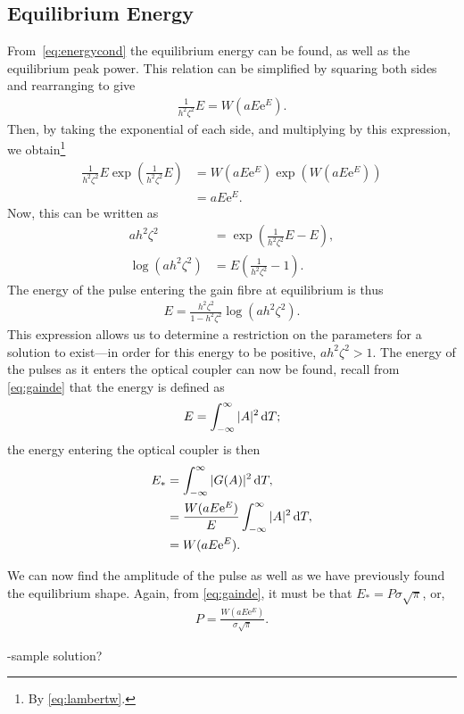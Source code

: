 \subsection{Equilibrium Energy}
From~\eqref{eq:energycond} the equilibrium energy can be found, as well as the equilibrium peak power. This relation can be simplified by squaring both sides and rearranging to give
\begin{align*}
\frac{1}{h^2 \zeta^2} E = W \left( a E \textrm{e}^E \right).
\end{align*}
Then, by taking the exponential of each side, and multiplying by this expression, we obtain\footnote{By \eqref{eq:lambertw}.}
\begin{align*}
\frac{1}{h^2 \zeta^2} E \exp \left(\frac{1}{h^2 \zeta^2} E \right) &= W \left( a E \textrm{e}^E \right) \exp \left( W \left( a E \textrm{e}^E \right) \right) \\
&= a E \textrm{e}^E.
\end{align*}
Now, this can be written as 
\begin{align*}
a h^2 \zeta^2 &= \exp \left( \frac{1}{h^2 \zeta^2}E - E \right), \\
\log \left( a h^2 \zeta^2 \right) &= E \left( \frac{1}{h^2 \zeta^2} - 1 \right).
\end{align*}
The energy of the pulse entering the gain fibre at equilibrium is thus
\begin{align*}
E = \frac{h^2 \zeta^2}{1 - h^2 \zeta^2} \log \left( a h^2 \zeta^2 \right).
\end{align*}
This expression allows us to determine a restriction on the parameters for a solution to exist---in order for this energy to be positive, $a h^2 \zeta^2 > 1$. The energy of the pulses as it enters the optical coupler can now be found, recall from \eqref{eq:gainde} that the energy is defined as
\begin{align*}
E = \int_{-\infty}^\infty |A|^2 \, \textrm{d} T;
\end{align*}
the energy entering the optical coupler is then
\begin{align}
\nonumber E_* &= \int_{-\infty}^\infty |G(A)|^2 \, \textrm{d} T, \\
\nonumber &= \frac{W(a E \textrm{e}^E)}{E} \int_{-\infty}^\infty |A|^2 \, \textrm{d} T, \\
&= W(a E \textrm{e}^E).
\end{align}

We can now find the amplitude of the pulse as well as we have previously found the equilibrium shape. Again, from \eqref{eq:gainde}, it must be that $E_* = P \sigma \sqrt{\pi}$, or,
\begin{align}
P = \frac{W(a E \textrm{e}^E)}{\sigma \sqrt{\pi}}.
\end{align}

-sample solution?
